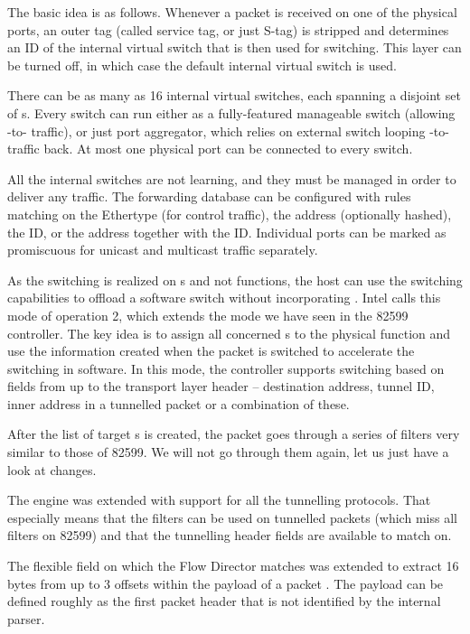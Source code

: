 The basic idea is as follows. Whenever a packet is received on one of the
physical ports, an outer  tag (called service  tag, or just
S-tag) is stripped and determines an ID of the internal virtual switch that is
then used for switching. This layer can be turned off, in which case the default
internal virtual switch is used.

There can be as many as 16 internal virtual switches, each spanning
a disjoint set of s. Every switch can run either as a fully-featured
manageable switch (allowing -to- traffic), or just port
aggregator, which relies on external switch looping -to-
traffic back. At most one physical port can be connected to every switch.

All the internal switches are not learning, and they must be managed in
order to deliver any traffic. The forwarding database can be configured with
rules matching on the  Ethertype (for control traffic), the  address (optionally
hashed), the  ID, or the  address together with the  ID. Individual
ports can be marked as promiscuous for unicast and multicast traffic separately.

As the switching is realized on s and not functions, the host can use
the switching capabilities to offload a software switch without incorporating
. Intel calls this mode of operation  2, which extends the
 mode we have seen in the 82599 controller. The key idea is to assign
all concerned s to the physical function and use the information created
when the packet is switched to accelerate the switching in software. In this
mode, the controller supports switching based on fields from up to the transport
layer header -- destination  address, tunnel ID, inner  address in
a tunnelled packet or a combination of these.

After the list of target s is created, the packet goes through a series
of filters very similar to those of 82599. We will not go through them again,
let us just have a look at changes.

The engine was extended with support for all the tunnelling protocols. That
especially means that the filters can be used on tunnelled packets (which miss
all filters on 82599) and that the tunnelling header fields are available to
match on.

The flexible field on which the Flow Director matches was extended to extract 16
bytes from up to 3 offsets within the payload of a packet . The
payload can be defined roughly as the first packet header that is not
identified by the internal parser.

